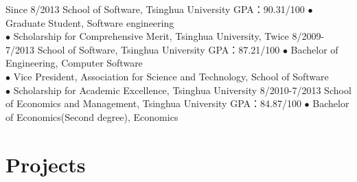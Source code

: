 \documentclass[]{friggeri-cv}
\begin{document}
\begin{entrylist}
  \entry
    {Since 8/2013}
    {School of Software, Tsinghua University}
    {GPA：90.31/100}
    {$\bullet$ Graduate Student, Software engineering \\
    $\bullet$ Scholarship for Comprehensive Merit, Tsinghua University, Twice
    }
  \entry
    {8/2009-7/2013}
    {School of Software, Tsinghua University}
    {GPA：87.21/100}
    {$\bullet$ Bachelor of Engineering, Computer Software \\
    $\bullet$ Vice President, Association for Science and Technology, School of Software\\
    $\bullet$ Scholarship for Academic Excellence, Tsinghua University
    }
  \entry
    {8/2010-7/2013}
    {School of Economics and Management, Tsinghua University}
    {GPA：84.87/100}
    {$\bullet$ Bachelor of Economics(Second degree), Economics}
\end{entrylist}

\section{Projects}
\end{document}
